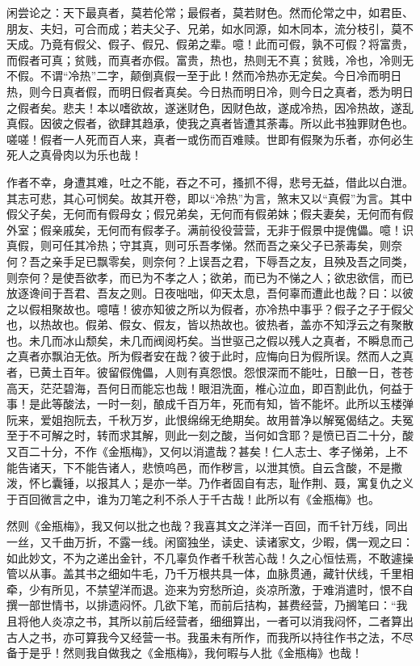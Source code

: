 \begin{showcontents}{}
{闲尝论之：天下最真者，莫若伦常；最假者，莫若财色。然而伦常之中，如君臣、朋友、夫妇，可合而成；若夫父子、兄弟，如水同源，如木同本，流分枝引，莫不天成。乃竟有假父、假子、假兄、假弟之辈。噫！此而可假，孰不可假？将富贵，而假者可真；贫贱，而真者亦假。富贵，热也，热则无不真；贫贱，冷也，冷则无不假。不谓“冷热”二字，颠倒真假一至于此！然而冷热亦无定矣。今日冷而明日热，则今日真者假，而明日假者真矣。今日热而明日冷，则今日之真者，悉为明日之假者矣。悲夫！本以嗜欲故，遂迷财色，因财色故，遂成冷热，因冷热故，遂乱真假。因彼之假者，欲肆其趋承，使我之真者皆遭其荼毒。所以此书独罪财色也。嗟嗟！假者一人死而百人来，真者一或伤而百难赎。世即有假聚为乐者，亦何必生死人之真骨肉以为乐也哉！

作者不幸，身遭其难，吐之不能，吞之不可，搔抓不得，悲号无益，借此以白泄。其志可悲，其心可悯矣。故其开卷，即以“冷热”为言，煞末又以“真假”为言。其中假父子矣，无何而有假母女；假兄弟矣，无何而有假弟妹；假夫妻矣，无何而有假外室；假亲戚矣，无何而有假孝子。满前役役营营，无非于假景中提傀儡。噫！识真假，则可任其冷热；守其真，则可乐吾孝悌。然而吾之亲父子已荼毒矣，则奈何？吾之亲手足已飘零矣，则奈何？上误吾之君，下辱吾之友，且殃及吾之同类，则奈何？是使吾欲孝，而已为不孝之人；欲弟，而已为不悌之人；欲忠欲信，而已放逐谗间于吾君、吾友之则。日夜咄咄，仰天太息，吾何辜而遭此也哉？曰：以彼之以假相聚故也。噫嘻！彼亦知彼之所以为假者，亦冷热中事乎？假子之子于假父也，以热故也。假弟、假女、假友，皆以热故也。彼热者，盖亦不知浮云之有聚散也。未几而冰山颓矣，未几而阀阅朽矣。当世驱己之假以残人之真者，不瞬息而己之真者亦飘泊无依。所为假者安在哉？彼于此时，应悔向日为假所误。然而人之真者，已黄土百年。彼留假傀儡，人则有真怨恨。怨恨深而不能吐，日酿一日，苍苍高天，茫茫碧海，吾何日而能忘也哉！眼泪洗面，椎心泣血，即百割此仇，何益于事！是此等酸法，一时一刻，酿成千百万年，死而有知，皆不能坏。此所以玉楼弹阮来，爱姐抱阮去，千秋万岁，此恨绵绵无绝期矣。故用普净以解冤偈结之。夫冤至于不可解之时，转而求其解，则此一刻之酸，当何如含耶？是愤已百二十分，酸又百二十分，不作《金瓶梅》，又何以消遣哉？甚矣！仁人志士、孝子悌弟，上不能告诸天，下不能告诸人，悲愤呜邑，而作秽言，以泄其愤。自云含酸，不是撒泼，怀匕囊锤，以报其人；是亦一举。乃作者固自有志，耻作荆、聂，寓复仇之义于百回微言之中，谁为刀笔之利不杀人于千古哉！此所以有《金瓶梅》也。


然则《金瓶梅》，我又何以批之也哉？我喜其文之洋洋一百回，而千针万线，同出一丝，又千曲万折，不露一线。闲窗独坐，读史、读诸家文，少暇，偶一观之曰：如此妙文，不为之递出金针，不几辜负作者千秋苦心哉！久之心恒怯焉，不敢遽操管以从事。盖其书之细如牛毛，乃千万根共具一体，血脉贯通，藏针伏线，千里相牵，少有所见，不禁望洋而退。迩来为穷愁所迫，炎凉所激，于难消遣时，恨不自撰一部世情书，以排遗闷怀。几欲下笔，而前后拮构，甚费经营，乃搁笔曰：“我且将他人炎凉之书，其所以前后经营者，细细算出，一者可以消我闷怀，二者算出古人之书，亦可算我今又经营一书。我虽未有所作，而我所以持往作书之法，不尽备于是乎！然则我自做我之《金瓶梅》，我何暇与人批《金瓶梅》也哉！

}
\end{showcontents}
